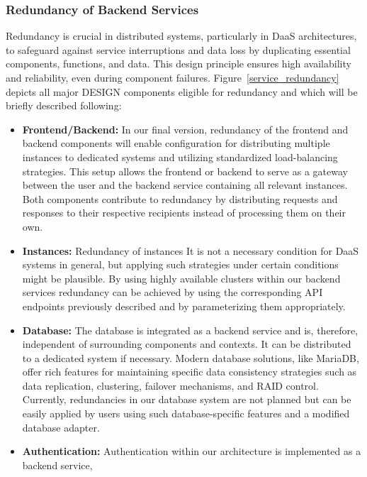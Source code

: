 \documentclass[runningheads]{llncs}
\begin{document}
\subsubsection{Redundancy of Backend Services}

Redundancy is crucial in distributed systems,
particularly in DaaS architectures,
to safeguard against service interruptions and data loss
by duplicating essential components, functions, and data.
This design principle ensures high availability and reliability,
even during component failures.
Figure~\ref{service_redundancy} depicts all major DESIGN components eligible for redundancy
and which will be briefly described following:
\begin{itemize}
	\item \textbf{Frontend/Backend:}
	      In our final version,
	      redundancy of the frontend and backend components
	      will enable configuration for distributing multiple instances
	      to dedicated systems and utilizing standardized load-balancing strategies.
	      This setup allows the frontend or backend
	      to serve as a gateway between the user and the backend service
	      containing all relevant instances.
	      Both components contribute to redundancy
	      by distributing requests and responses to their respective recipients
	      instead of processing them on their own.
	\item \textbf{Instances:} Redundancy of instances
	      It is not a necessary condition for DaaS systems in general,
	      but applying such strategies under certain conditions might be plausible.
	      By using highly available clusters within our backend services
	      redundancy can be achieved by using the corresponding API endpoints
	      previously described and by parameterizing them appropriately.
\item \textbf{Database:}
	      The database is integrated as a backend service
	      and is, therefore, independent of surrounding components and contexts.
	      It can be distributed to a dedicated system if necessary.
	      Modern database solutions, like MariaDB,
	      offer rich features for maintaining specific data consistency strategies
	      such as data replication, clustering, failover mechanisms,
	      and RAID control.
	      Currently, redundancies in our database system are not planned
	      but can be easily applied by users using such database-specific features
	      and a modified database adapter.
	\item \textbf{Authentication: }
	      Authentication within our architecture is implemented as a backend service,

\end{itemize}
\end{document}
